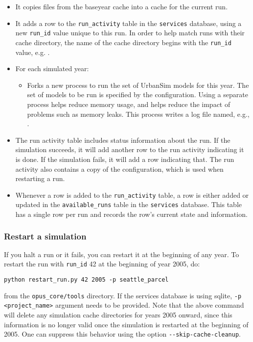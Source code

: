 \begin{itemize}
\item It copies files from the baseyear cache into
a cache for the current run.
\item It adds a row to the \verb|run_activity| table in the \verb|services|
database, using a new \verb|run_id| value unique to this run. In order to help
match runs with their cache directory, the name of the cache directory begins
with the \verb|run_id| value, e.g. .
\item For each simulated year:
  \begin{itemize}
  \item Forks a new process to run the set of UrbanSim models for this year.
  The set of models to be run is specified by the configuration. Using a
  separate process helps reduce memory usage,  and helps reduce the impact of problems such as memory leaks.  This
  process writes a log file named, e.g., .
  \end{itemize}
 \item The run activity table includes status information about the run.  If
  the simulation succeeds, it will add another row to the run activity
  indicating it is done.  If the simulation fails, it will add a row indicating
  that.  The run activity also contains a copy of the configuration, which is
  used when restarting a run.
  \item Whenever a row is added to the \verb|run_activity| table, a row is
  either added or updated in the \verb|available_runs| table in the
  \verb|services| database. This table has a single row per run and records the
  row's current state and information.
\end{itemize}

\subsubsection{Restart a simulation}
If you halt a run or it fails, you can restart it at the beginning of any year.
To restart the run with \verb|run_id| 42 at the beginning of year 2005, do:

\begin{verbatim}
python restart_run.py 42 2005 -p seattle_parcel
\end{verbatim}
from the \verb|opus_core/tools| directory. If the services database is using sqlite, 
\verb|-p <project_name>| argument needs to be provided. Note that the above command will delete any
simulation cache directories for years 2005 onward, since
this information is no longer valid once the simulation is restarted at the
beginning of 2005. One can suppress this behavior using the option \verb|--skip-cache-cleanup|.


